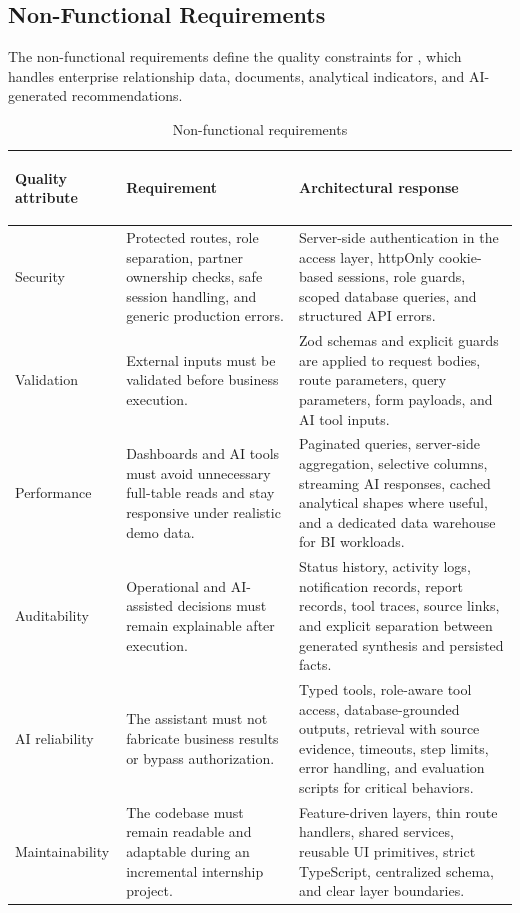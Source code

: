 \subsection{Non-Functional Requirements}
The non-functional requirements define the quality constraints for \projectname{}, which handles enterprise relationship data, documents, analytical indicators, and AI-generated recommendations.

\begin{table}[H]
  \centering
  \caption{Non-functional requirements}
  \begin{tabularx}{\textwidth}{>{\bfseries\raggedright\arraybackslash}p{3.1cm}>{\raggedright\arraybackslash}p{4.2cm}X}
    \toprule
    Quality attribute & Requirement & Architectural response \\
    \midrule
    Security & Protected routes, role separation, partner ownership checks, safe session handling, and generic production errors. & Server-side authentication in the access layer, httpOnly cookie-based sessions, role guards, scoped database queries, and structured API errors. \\
    Validation & External inputs must be validated before business execution. & Zod schemas and explicit guards are applied to request bodies, route parameters, query parameters, form payloads, and AI tool inputs. \\
    Performance & Dashboards and AI tools must avoid unnecessary full-table reads and stay responsive under realistic demo data. & Paginated queries, server-side aggregation, selective columns, streaming AI responses, cached analytical shapes where useful, and a dedicated data warehouse for BI workloads. \\
    Auditability & Operational and AI-assisted decisions must remain explainable after execution. & Status history, activity logs, notification records, report records, tool traces, source links, and explicit separation between generated synthesis and persisted facts. \\
    AI reliability & The assistant must not fabricate business results or bypass authorization. & Typed tools, role-aware tool access, database-grounded outputs, retrieval with source evidence, timeouts, step limits, error handling, and evaluation scripts for critical behaviors. \\
    Maintainability & The codebase must remain readable and adaptable during an incremental internship project. & Feature-driven layers, thin route handlers, shared services, reusable UI primitives, strict TypeScript, centralized schema, and clear layer boundaries. \\
    \bottomrule
  \end{tabularx}
\end{table}
